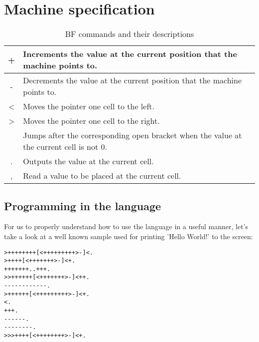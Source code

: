 \clearpage

\section{Machine specification}
\label{sec:ch2sec1}

\begin{table}[H]
\centering
\begin{tabularx}{\textwidth}{| c | Y |}
\hline
+ & Increments the value at the current position that the machine points to. \\ \hline
- & Decrements the value at the current position that the machine points to. \\ \hline
\textless & Moves the pointer one cell to the left.                                  \\ \hline
\textgreater & Moves the pointer one cell to the right.                                 \\  & Jumps after the corresponding open bracket when the value at the current cell is not 0.   \\ \hline
. & Outputs the value at the current cell. \\ \hline
, & Read a value to be placed at the current cell. \\ \hline
\end{tabularx}
\caption{BF commands and their descriptions}
\end{table}

\clearpage

\subsection{Programming in the language}
\label{sec:ch2sec1sub1}

\par For us to properly understand how to use the language in a useful manner, let's take a look at a well known sample used for printing 'Hello World!' to the screen:
\begin{verbatim}
>++++++++[<+++++++++>-]<.
>++++[<+++++++>-]<+.
+++++++..+++.
>>++++++[<+++++++>-]<++.
------------.
>++++++[<+++++++++>-]<+.
<.
+++.
------.
--------.
>>>++++[<++++++++>-]<+.
\end{verbatim}

